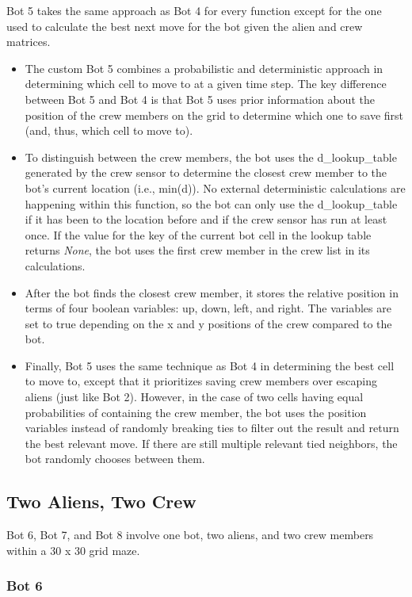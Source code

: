 \documentclass[11pt]{article}
\begin{document}
Bot 5 takes the same approach as Bot 4 for every function except for the one used to calculate the best next move for the bot given the alien and crew matrices.

\begin{itemize}
    \item The custom Bot 5 combines a probabilistic and deterministic approach in determining which cell to move to at a given time step. The key difference between Bot 5 and Bot 4 is that Bot 5 uses prior information about the position of the crew members on the grid to determine which one to save first (and, thus, which cell to move to).
    \item To distinguish between the crew members, the bot uses the d\_lookup\_table generated by the crew sensor to determine the closest crew member to the bot's current location (i.e., min(d)). No external deterministic calculations are happening within this function, so the bot can only use the d\_lookup\_table if it has been to the location before and if the crew sensor has run at least once. If the value for the key of the current bot cell in the lookup table returns \emph{None}, the bot uses the first crew member in the crew list in its calculations.
    \item After the bot finds the closest crew member, it stores the relative position in terms of four boolean variables: up, down, left, and right. The variables are set to true depending on the x and y positions of the crew compared to the bot.
    \item Finally, Bot 5 uses the same technique as Bot 4 in determining the best cell to move to, except that it prioritizes saving crew members over escaping aliens (just like Bot 2). However, in the case of two cells having equal probabilities of containing the crew member, the bot uses the position variables instead of randomly breaking ties to filter out the result and return the best relevant move. If there are still multiple relevant tied neighbors, the bot randomly chooses between them.
\end{itemize}

\subsection{Two Aliens, Two Crew}

Bot 6, Bot 7, and Bot 8 involve one bot, two aliens, and two crew members within a 30 x 30 grid maze.

\subsubsection{Bot 6}
\end{document}
